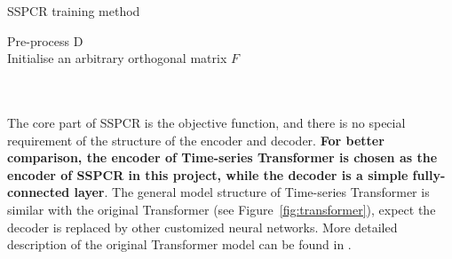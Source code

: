 \begin{algorithm}[!htbp]
    \caption{SSPCR training method}
    \label{alg:sspcr}
    \LinesNumbered 
    Pre-process D \\
    Initialise an arbitrary orthogonal matrix $F$\\
    {
    }
\end{algorithm}
\\\\The core part of SSPCR is the objective function, and there is no special requirement of the structure of the encoder and decoder. \textbf{For better comparison, the encoder of Time-series Transformer \cite{zerveas2020transformer} is chosen as the encoder of SSPCR in this project, while the decoder is a simple fully-connected layer}. The general model structure of Time-series Transformer is similar with the original Transformer (see Figure~\ref{fig:transformer}), expect the decoder is replaced by other customized neural networks. More detailed description of the original Transformer model can be found in \cite{vaswani2017attention}.
